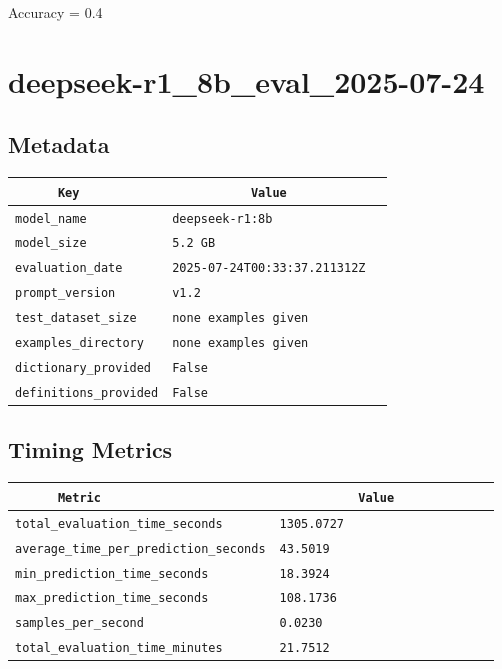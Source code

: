 \documentclass{article}
\begin{document}
\begin{center}
Accuracy = 0.4
\end{center}

\section{deepseek-r1\_8b\_eval\_2025-07-24}
\subsection{Metadata}

\begin{center}
\begin{tabular}{l | l} \hline
    \verb|      Key      | & \verb|           Value           | \\ \hline
    \hline
    \verb|model_name    | & \verb|deepseek-r1:8b               | \\ \hline
    \verb|model_size    | & \verb|5.2 GB                       | \\ \hline
    \verb|evaluation_date| & \verb|2025-07-24T00:33:37.211312Z  | \\ \hline
    \verb|prompt_version| & \verb|v1.2                         | \\ \hline
    \verb|test_dataset_size| & \verb|none examples given          | \\ \hline
    \verb|examples_directory| & \verb|none examples given          | \\ \hline
    \verb|dictionary_provided| & \verb|False                        | \\ \hline
    \verb|definitions_provided| & \verb|False                        | \\ \hline
\end{tabular}
\end{center}

\subsection{Timing Metrics}

\begin{center}
\begin{tabular}{l | l} \hline
    \verb|      Metric     | & \verb|           Value           | \\ \hline
    \hline
    \verb|total_evaluation_time_seconds| & \verb|1305.0727                    | \\ \hline
    \verb|average_time_per_prediction_seconds| & \verb|43.5019                      | \\ \hline
    \verb|min_prediction_time_seconds| & \verb|18.3924                      | \\ \hline
    \verb|max_prediction_time_seconds| & \verb|108.1736                     | \\ \hline
    \verb|samples_per_second| & \verb|0.0230                       | \\ \hline
    \verb|total_evaluation_time_minutes| & \verb|21.7512                      | \\ \hline
\end{tabular}
\end{center}
\end{document}
